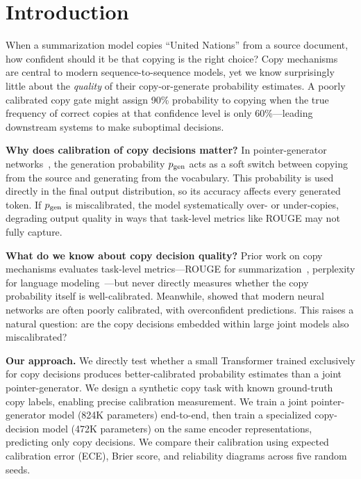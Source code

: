 \section{Introduction}
\label{sec:intro}

When a summarization model copies ``United Nations'' from a source document, how confident should it be that copying is the right choice? Copy mechanisms~\cite{vinyals2015pointer,gu2016copynet,see2017get} are central to modern sequence-to-sequence models, yet we know surprisingly little about the \emph{quality} of their copy-or-generate probability estimates. A poorly calibrated copy gate might assign 90\% probability to copying when the true frequency of correct copies at that confidence level is only 60\%---leading downstream systems to make suboptimal decisions.

{\bf Why does calibration of copy decisions matter?} In pointer-generator networks~\cite{see2017get}, the generation probability $p_{\text{gen}}$ acts as a soft switch between copying from the source and generating from the vocabulary. This probability is used directly in the final output distribution, so its accuracy affects every generated token. If $p_{\text{gen}}$ is miscalibrated, the model systematically over- or under-copies, degrading output quality in ways that task-level metrics like ROUGE may not fully capture.

{\bf What do we know about copy decision quality?} Prior work on copy mechanisms evaluates task-level metrics---ROUGE for summarization~\cite{see2017get}, perplexity for language modeling~\cite{merity2016pointer}---but never directly measures whether the copy probability itself is well-calibrated. Meanwhile, \citet{guo2017calibration} showed that modern neural networks are often poorly calibrated, with overconfident predictions. This raises a natural question: are the copy decisions embedded within large joint models also miscalibrated?

{\bf Our approach.} We directly test whether a small Transformer trained exclusively for copy decisions produces better-calibrated probability estimates than a joint pointer-generator. We design a synthetic copy task with known ground-truth copy labels, enabling precise calibration measurement. We train a joint pointer-generator model (824K parameters) end-to-end, then train a specialized copy-decision model (472K parameters) on the same encoder representations, predicting only copy decisions. We compare their calibration using expected calibration error (ECE), Brier score, and reliability diagrams across five random seeds.

